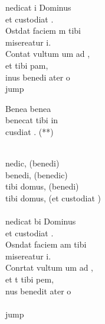 \begin{cancion}[Benedicat][]%
	nedicat i Dominus \\
	et custodiat .\\
	Ostdat faciem m tibi\\
	 misereatur i.\\
	Contat vultum um ad ,\\
	et  tibi pam,\\
	inus benedi ater o \\jump\\
	\begin{chorus}%
	Benea     benea \\
	benecat tibi in\\
	 cusdiat . (**)\\
	\end{chorus}%
	\jump\\
	nedic, (benedi)\\
	benedi, (benedic)\\
	tibi domus, (benedi)\\
	tibi domus, (et custodiat )\\
	\jump\\
	nedicat bi Dominus\\
	et custodiat .\\
	Osndat faciem am tibi\\
	 misereatur i.\\
	Conrtat vultum um ad ,\\
	et t tibi pem,\\
	nus benedit ater o \\
	\jump\\jump\\

\end{cancion}
